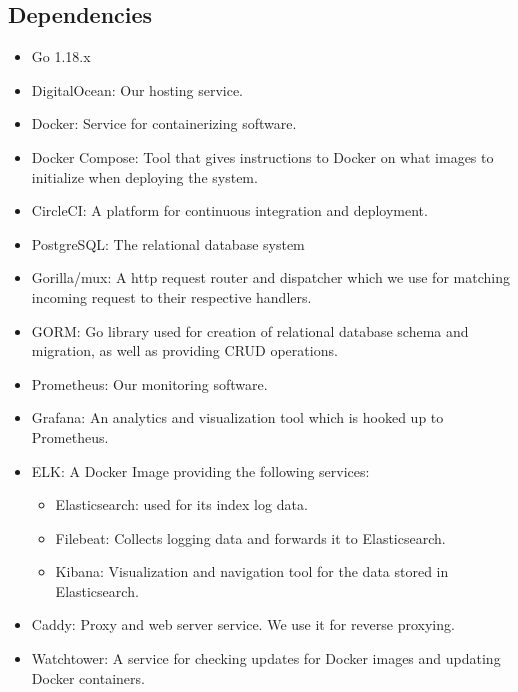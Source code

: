 \subsection{Dependencies}
\begin{itemize}
    \item Go 1.18.x
    \vspace{0.5em}
    \item DigitalOcean: Our hosting service.
    \vspace{0.5em}
    \item Docker: Service for containerizing software.
    \vspace{0.5em}
    \item Docker Compose: Tool that gives instructions to Docker on what images to initialize when deploying the system. 
    \vspace{0.5em}
    \item CircleCI: A platform for continuous integration and deployment.
    \vspace{0.5em}
    \item PostgreSQL: The relational database system \vspace{0.5em}
    \item Gorilla/mux: A http request router and dispatcher which we use for matching incoming request to their respective handlers. 
    \vspace{0.5em}
    \item GORM: Go library used for creation of relational database schema and migration, as well as providing CRUD operations. 
    \vspace{0.5em}
    \item Prometheus: Our monitoring software.
    \vspace{0.5em}
    \item Grafana: An analytics and visualization tool which is hooked up to Prometheus.
    \vspace{0.5em}
    \item ELK: A Docker Image providing the following services: 
    \vspace{0.5em}
    \begin{itemize}
        \item Elasticsearch: used for its index log data.
        \vspace{0.5em}
        \item Filebeat: Collects logging data and forwards it to Elasticsearch.
        \vspace{0.5em}
        \item Kibana: Visualization and navigation tool for the data stored in Elasticsearch. 
        \vspace{0.5em}
    \end{itemize}
    \item Caddy: Proxy and web server service. We use it for reverse proxying.
    \vspace{0.5em}
    \item Watchtower: A service for checking updates for Docker images and updating Docker containers.
\end{itemize}

